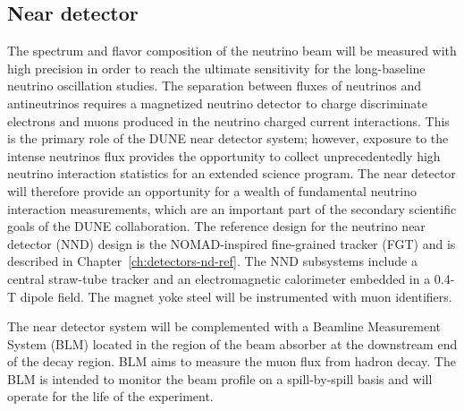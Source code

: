 \subsection{Near detector}
\label{sec:intro-dune-near-det}

The spectrum and flavor composition of the neutrino beam will be
measured with high precision in order to reach the ultimate
sensitivity for the long-baseline neutrino oscillation studies.  The
separation between fluxes of neutrinos and antineutrinos requires a
magnetized neutrino detector to charge discriminate electrons and
muons produced in the neutrino charged current interactions.  This is
the primary role of the DUNE near detector system; however, exposure
to the intense neutrinos flux provides the opportunity to collect
unprecedentedly high neutrino interaction statistics for an extended
science program.  The near detector will therefore provide an
opportunity for a wealth of fundamental neutrino interaction
measurements, which are an important part of the secondary scientific
goals of the DUNE collaboration.  The reference design for the
neutrino near detector (NND) design is the NOMAD-inspired fine-grained
tracker (FGT) and is described in
Chapter~\ref{ch:detectors-nd-ref}. The NND subsystems include a
central straw-tube tracker and an electromagnetic calorimeter embedded
in a 0.4-T dipole field. The magnet yoke steel will be instrumented
with muon identifiers.

The near detector system will be complemented with a Beamline
Measurement System (BLM) located in the region of the beam absorber at
the downstream end of the decay region. BLM aims to measure the muon
flux from hadron decay.  The BLM is intended to monitor the beam
profile on a spill-by-spill basis and will operate for the life of
the experiment.
